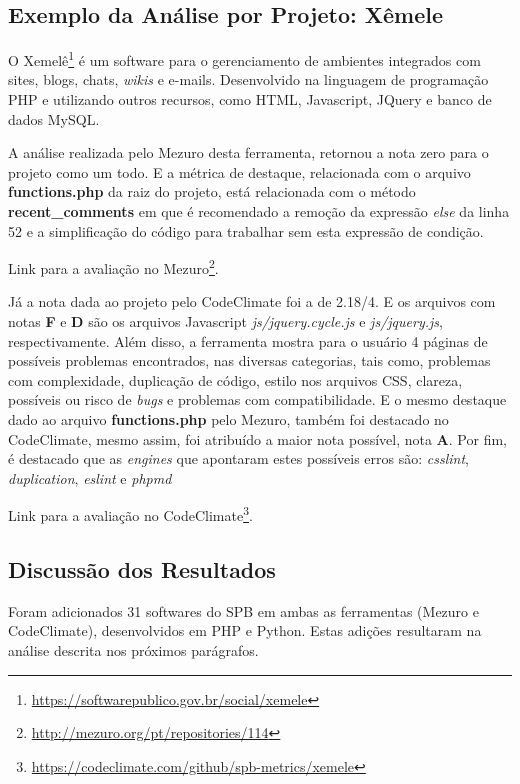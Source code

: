 \subsection{Exemplo da Análise por Projeto: Xêmele}


O Xemelê\footnote{\url{https://softwarepublico.gov.br/social/xemele}} é um
software para o gerenciamento de ambientes integrados com sites, blogs, chats,
\textit{wikis} e e-mails. Desenvolvido na linguagem de programação PHP e
utilizando outros recursos, como HTML, Javascript, JQuery e banco de dados MySQL.

A análise realizada pelo Mezuro desta ferramenta, retornou a nota zero para o
projeto como um todo. E a métrica de destaque, relacionada com o arquivo
\textbf{functions.php} da raiz do projeto, está relacionada com o método
\textbf{recent\_comments} em que é recomendado a remoção da expressão
\textit{else} da linha 52 e a simplificação do código para trabalhar sem esta
expressão de condição.

Link para a avaliação no Mezuro\footnote{\url{http://mezuro.org/pt/repositories/114}}.

Já a nota dada ao projeto pelo CodeClimate foi a de 2.18/4. E os arquivos com
notas \textbf{F} e \textbf{D} são os arquivos Javascript \textit{js/jquery.cycle.js}
e \textit{js/jquery.js}, respectivamente. Além disso, a ferramenta mostra para o
usuário 4 páginas de possíveis problemas encontrados, nas diversas categorias,
tais como, problemas com complexidade, duplicação de código, estilo nos arquivos
CSS, clareza, possíveis ou risco de \textit{bugs} e problemas com compatibilidade. E o
mesmo destaque dado ao arquivo \textbf{functions.php} pelo Mezuro, também foi
destacado no CodeClimate, mesmo assim, foi atribuído a maior nota possível, nota
\textbf{A}. Por fim, é destacado que as \textit{engines} que apontaram estes possíveis
erros são: \textit{csslint}, \textit{duplication}, \textit{eslint} e
\textit{phpmd}

Link para a avaliação no CodeClimate\footnote{\url{https://codeclimate.com/github/spb-metrics/xemele}}.

\subsection{Discussão dos Resultados}

Foram adicionados 31 softwares do SPB em ambas as ferramentas (Mezuro e
CodeClimate), desenvolvidos em PHP e Python. Estas adições resultaram na
análise descrita nos próximos parágrafos.


